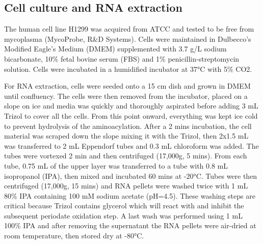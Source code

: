 \documentclass[9pt,lineno]{elife}
\begin{document}
\subsection{Cell culture and RNA extraction}
The human cell line H1299 was acquired from ATCC and tested to be free from mycoplasma (MycoProbe, R\&D Systems).
Cells were maintained in Dulbecco’s Modified Eagle’s Medium (DMEM) supplemented with 3.7 g/L sodium bicarbonate, 10\% fetal bovine serum (FBS) and 1\% penicillin-streptomycin solution.
Cells were incubated in a humidified incubator at 37°C with 5\% CO2.

For RNA extraction, cells were seeded onto a 15 cm dish and grown in DMEM until confluency.
The cells were then removed from the incubator, placed on a slope on ice and media was quickly and thoroughly aspirated before adding 3 mL Trizol to cover all the cells.
From this point onward, everything was kept ice cold to prevent hydrolysis of the aminoacylation.
After a 2 mins incubation, the cell material was scraped down the slope mixing it with the Trizol, then 2x1.5 mL was transferred to 2 mL Eppendorf tubes and 0.3 mL chloroform was added.
The tubes were vortexed 2 min and then centrifuged (17,000g, 5 mins).
From each tube, 0.75 mL of the upper layer was transferred to a tube with 0.8 mL isopropanol (IPA), then mixed and incubated 60 mins at -20°C.
Tubes were then centrifuged (17,000g, 15 mins) and RNA pellets were washed twice with 1 mL 80\% IPA containing 100 mM sodium acetate (pH=4.5).
These washing steps are critical because Trizol contains glycerol which will react with and inhibit the subsequent periodate oxidation step.
A last wash was performed using 1 mL 100\% IPA and after removing the supernatant the RNA pellets were air-dried at room temperature, then stored dry at -80°C.
\end{document}
